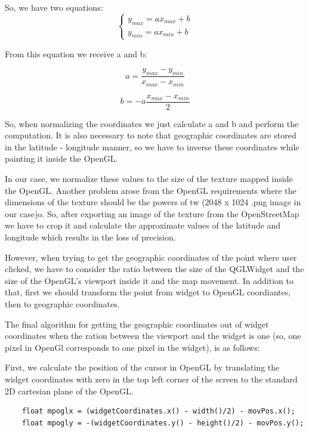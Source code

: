 \documentclass{article}
\begin{document}
So, we have two equations:
$$
\begin{cases}
y_{max} = ax_{max} + b \\
y_{min} = ax_{min} + b
\end{cases}
$$

From this equation we receive a and b:

\begin{equation}
a = \frac{y_{max} - y_{min}}{x_{max} - x_{min}}
\end{equation}

\begin{equation}
b = -a\frac{x_{max} - x_{min}}{2}
\end{equation}

So, when normalizing the coordinates we just calculate a and b and perform the computation. It is also necessary to note that geographic coordinates are stored in the latitude - longitude manner, so we have to inverse these coordinates while painting it inside the OpenGL.

In our case, we normalize these values to the size of the texture mapped inside the OpenGL. Another problem arose from the OpenGL requirements where the dimensions of the texture should be the powers of tw (2048 x 1024 .png image in our case)o. So, after exporting an image of the texture from the OpenStreetMap we have to crop it and calculate the approximate values of the latitude and longitude which results in the loss of precision.

However, when trying to get the geographic coordinates of the point where user clicked, we have to consider the ratio between the size of the QGLWidget and the size of the OpenGL's viewport inside it and the map movement. In addition to that, first we should transform the point from widget to OpenGL coordiantes, then to geographic coordinates.

The final algorithm for getting the geographic coordinates out of widget coordinates when the ration between the viewport and the widget is one (so, one pixel in OpenGl corresponds to one pixel in the widget), is as follows:

First, we calculate the position of the cursor in OpenGL by translating the widget coordinates with zero in the top left corner of the screen to the standard 2D cartesian plane of the OpenGL.

\begin{lstlisting}
    float mpoglx = (widgetCoordinates.x() - width()/2) - movPos.x();
    float mpogly = -(widgetCoordinates.y() - height()/2) - movPos.y();
\end{lstlisting}
\end{document}
